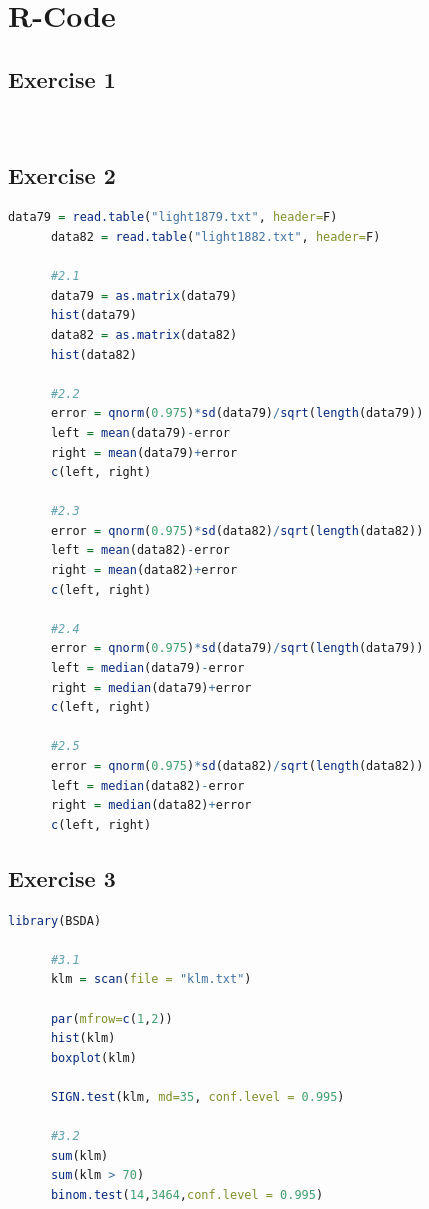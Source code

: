\documentclass{article}
\begin{document}
  \section{R-Code}
    \subsection{Exercise 1}\label{sec:RE1}
      \begin{lstlisting}[language=R]
      
      \end{lstlisting}
    \subsection{Exercise 2}\label{sec:RE2}
      \begin{lstlisting}[language=R]
      data79 = read.table("light1879.txt", header=F)
      data82 = read.table("light1882.txt", header=F)

      #2.1
      data79 = as.matrix(data79)
      hist(data79)
      data82 = as.matrix(data82)
      hist(data82)

      #2.2
      error = qnorm(0.975)*sd(data79)/sqrt(length(data79))
      left = mean(data79)-error
      right = mean(data79)+error
      c(left, right)

      #2.3
      error = qnorm(0.975)*sd(data82)/sqrt(length(data82))
      left = mean(data82)-error
      right = mean(data82)+error
      c(left, right)

      #2.4
      error = qnorm(0.975)*sd(data79)/sqrt(length(data79))
      left = median(data79)-error
      right = median(data79)+error
      c(left, right)

      #2.5
      error = qnorm(0.975)*sd(data82)/sqrt(length(data82))
      left = median(data82)-error
      right = median(data82)+error
      c(left, right)
      \end{lstlisting}
    \subsection{Exercise 3}\label{sec:RE3}
      \begin{lstlisting}[language=R]
      library(BSDA)

      #3.1
      klm = scan(file = "klm.txt")

      par(mfrow=c(1,2))
      hist(klm)
      boxplot(klm)

      SIGN.test(klm, md=35, conf.level = 0.995)

      #3.2
      sum(klm)
      sum(klm > 70)
      binom.test(14,3464,conf.level = 0.995)

      \end{lstlisting}
\end{document}
